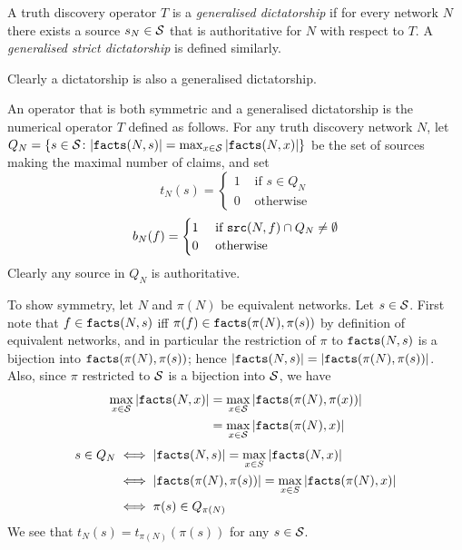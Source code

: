 \documentclass[../main.tex]{subfiles}
\begin{document}
\begin{definition}
\label{def:gen_dict}
A truth discovery operator $T$ is a \emph{generalised dictatorship} if for
every network $N$ there exists a source $s_N \in \S$ that is authoritative for
$N$ with respect to $T$. A \emph{generalised strict dictatorship} is defined
similarly.
\end{definition}

Clearly a dictatorship is also a generalised dictatorship.

\begin{example}
\label{example:symm_and_gen_dict}
An operator that is both symmetric and a generalised dictatorship is the
numerical operator $T$ defined as follows. For any truth discovery network $N$,
let $Q_N = \{s \in \S \colon |\fact(N, s)| = \max_{x \in \S}{|\fact(N, x)|}\}$
be the set of sources making the maximal number of claims, and set
\[
    t_N(s) = \begin{cases}
        1 & \text{ if } s \in Q_N \\
        0 & \text{ otherwise}
    \end{cases}
\]
\[
    b_N(f) = \begin{cases}
        1 & \text{ if } \src(N, f) \cap Q_N \ne \emptyset \\
        0 & \text{ otherwise}
    \end{cases}
\]
Clearly any source in $Q_N$ is authoritative.

To show symmetry, let $N$ and $\pi(N)$ be equivalent networks. Let $s \in \S$.
First note that $f \in \fact(N, s)$ iff $\pi(f) \in \fact(\pi(N), \pi(s))$ by
definition of equivalent networks, and in particular the restriction of $\pi$
to $\fact(N, s)$ is a bijection into $\fact(\pi(N), \pi(s))$; hence $|\fact(N,
s)| = |\fact(\pi(N), \pi(s))|$. Also, since $\pi$ restricted to $\S$ is a
bijection into $\S$, we have
\begin{align*}
    \max_{x \in \S}{|\fact(N, x)|} & = \max_{x \in \S}{|\fact(\pi(N), \pi(x))|} \\
                                   & = \max_{x \in \S}{|\fact(\pi(N), x)|}
\end{align*}
\begin{align*}
    s \in Q_N & \iff |\fact(N, s)| = \max_{x \in S}{|\fact(N, x)|} \\
              & \iff |\fact(\pi(N), \pi(s))| = \max_{x \in S}{|\fact(\pi(N), x)|} \\
              & \iff \pi(s) \in Q_{\pi(N)}
\end{align*}
We see that $t_N(s) = t_{\pi(N)}(\pi(s))$ for any $s \in \S$.


\end{example}
\end{document}
